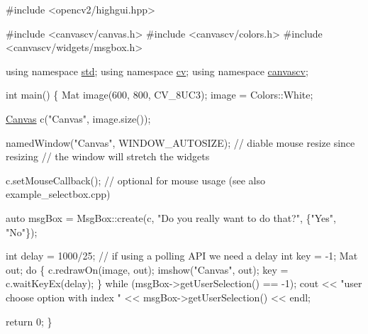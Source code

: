 
\begin{DoxyCode}
\textcolor{preprocessor}{#include <opencv2/highgui.hpp>}

\textcolor{preprocessor}{#include <canvascv/canvas.h>}
\textcolor{preprocessor}{#include <canvascv/colors.h>}
\textcolor{preprocessor}{#include <canvascv/widgets/msgbox.h>}

\textcolor{keyword}{using namespace }\hyperlink{namespacestd}{std};
\textcolor{keyword}{using namespace }\hyperlink{namespacecv}{cv};
\textcolor{keyword}{using namespace }\hyperlink{namespacecanvascv}{canvascv};

\textcolor{keywordtype}{int} main()
\{
    Mat image(600, 800, CV\_8UC3);
    image = Colors::White;

    \hyperlink{classcanvascv_1_1Canvas}{Canvas} c(\textcolor{stringliteral}{"Canvas"}, image.size());

    namedWindow(\textcolor{stringliteral}{"Canvas"},
                WINDOW\_AUTOSIZE); \textcolor{comment}{// diable mouse resize since resizing}
                                  \textcolor{comment}{// the window will stretch the widgets}

    c.setMouseCallback(); \textcolor{comment}{// optional for mouse usage (see also example\_selectbox.cpp)}

    \textcolor{keyword}{auto} msgBox = MsgBox::create(c, \textcolor{stringliteral}{"Do you really want to do that?"}, \{\textcolor{stringliteral}{"Yes"}, \textcolor{stringliteral}{"No"}\});

    \textcolor{keywordtype}{int} delay = 1000/25; \textcolor{comment}{// if using a polling API we need a delay}
    \textcolor{keywordtype}{int} key = -1;
    Mat out;
    \textcolor{keywordflow}{do}
    \{
        c.redrawOn(image, out);
        imshow(\textcolor{stringliteral}{"Canvas"}, out);
        key = c.waitKeyEx(delay);
    \} \textcolor{keywordflow}{while} (msgBox->getUserSelection() == -1);
    cout << \textcolor{stringliteral}{"user choose option with index "} << msgBox->getUserSelection() << endl;

    \textcolor{keywordflow}{return} 0;
\}
\end{DoxyCode}
 